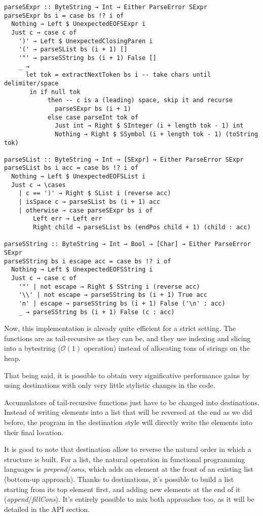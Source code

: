 \documentclass[english]{jflart}
\begin{document}
\begin{verbatim}
parseSExpr :: ByteString → Int → Either ParseError SExpr
parseSExpr bs i = case bs !? i of
  Nothing → Left $ UnexpectedEOFSExpr i
  Just c → case c of
    ')' → Left $ UnexpectedClosingParen i
    '(' → parseSList bs (i + 1) []
    '"' → parseSString bs (i + 1) False []
    _ →
      let tok = extractNextToken bs i -- take chars until delimiter/space
       in if null tok
            then -- c is a (leading) space, skip it and recurse
              parseSExpr bs (i + 1)
            else case parseInt tok of
              Just int → Right $ SInteger (i + length tok - 1) int
              Nothing → Right $ SSymbol (i + length tok - 1) (toString tok)

parseSList :: ByteString → Int → [SExpr] → Either ParseError SExpr
parseSList bs i acc = case bs !? i of
  Nothing → Left $ UnexpectedEOFSList i
  Just c → \cases
    | c == ')' → Right $ SList i (reverse acc)
    | isSpace c → parseSList bs (i + 1) acc
    | otherwise → case parseSExpr bs i of
        Left err → Left err
        Right child → parseSList bs (endPos child + 1) (child : acc)

parseSString :: ByteString → Int → Bool → [Char] → Either ParseError SExpr
parseSString bs i escape acc = case bs !? i of
  Nothing → Left $ UnexpectedEOFSString i
  Just c → case c of
    '"' | not escape → Right $ SString i (reverse acc)
    '\\' | not escape → parseSString bs (i + 1) True acc
    'n' | escape → parseSString bs (i + 1) False ('\n' : acc)
    _ → parseSString bs (i + 1) False (c : acc)
\end{verbatim}

Now, this implementation is already quite efficient for a strict setting. The functions are as tail-recursive as they can be, and they use indexing and slicing into a bytestring ($\mathcal{O}(1)$ operation) instead of allocating tons of strings on the heap.

That being said, it is possible to obtain very significative performance gains by using destinations with only very little stylistic changes in the code.

Accumulators of tail-recursive functions just have to be changed into destinations. Instead of writing elements into a list that will be reversed at the end as we did before, the program in the destination style will directly write the elements into their final location.

It is good to note that destination allow to reverse the natural order in which a structure is built. For a list, the natural operation in functional programming languages is \emph{prepend}/\emph{cons}, which adds an element at the front of an existing list (bottom-up approach). Thanks to destinations, it's possible to build a list starting from its top element first, and adding new elements at the end of it (\emph{append}/\emph{fillCons}). It's entirely possible to mix both approaches too, as it will be detailed in the API section.
\end{document}
